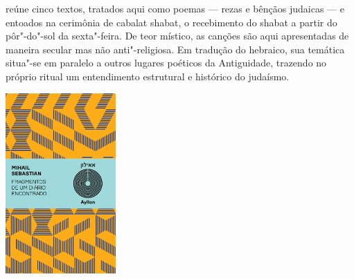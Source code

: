 \hspace*{-7cm}\hrulefill\hspace*{-7cm}

\medskip

 reúne cinco textos, tratados aqui como poemas --- rezas e bênçãos judaicas --- e entoados na cerimônia de cabalat shabat, o recebimento do shabat a partir do pôr"-do"-sol da sexta"-feira. De teor místico, as canções são aqui apresentadas de maneira secular mas não anti"-religiosa. Em tradução do hebraico, sua temática situa"-se em paralelo a outros lugares poéticos da Antiguidade, trazendo no próprio ritual um entendimento estrutural e histórico do judaísmo. %

\vfill

\hspace*{-.4cm}\begin{minipage}[c]{1\linewidth}
\small{
{}}
\end{minipage}


\pagebreak

\hspace{.5cm}

\begin{center}
\hspace*{-2.8cm}
\hspace*{2cm}\includegraphics[width=42mm]{./imgs/sebastian.png}
\end{center}

